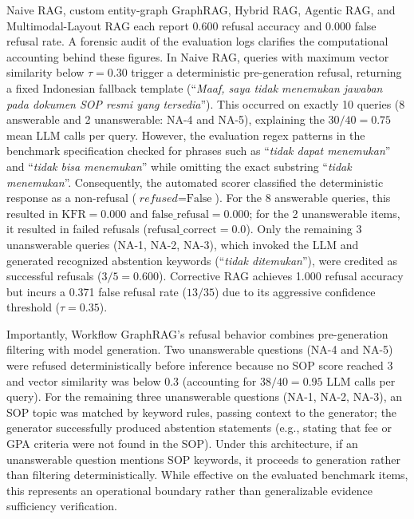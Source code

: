 \documentclass[preprint,10pt]{elsarticle}
\begin{document}
Naive RAG, custom entity-graph GraphRAG, Hybrid RAG, Agentic RAG, and Multimodal-Layout RAG each report 0.600 refusal accuracy and 0.000 false refusal rate. A forensic audit of the evaluation logs clarifies the computational accounting behind these figures. In Naive RAG, queries with maximum vector similarity below $\tau=0.30$ trigger a deterministic pre-generation refusal, returning a fixed Indonesian fallback template (``\textit{Maaf, saya tidak menemukan jawaban pada dokumen SOP resmi yang tersedia}''). This occurred on exactly 10 queries (8 answerable and 2 unanswerable: NA-4 and NA-5), explaining the $30/40 = 0.75$ mean LLM calls per query. However, the evaluation regex patterns in the benchmark specification checked for phrases such as ``\textit{tidak dapat menemukan}'' and ``\textit{tidak bisa menemukan}'' while omitting the exact substring ``\textit{tidak menemukan}''. Consequently, the automated scorer classified the deterministic response as a non-refusal ($\textit{refused} = \text{False}$). For the 8 answerable queries, this resulted in $\text{KFR} = 0.000$ and $\text{false\_refusal} = 0.000$; for the 2 unanswerable items, it resulted in failed refusals ($\text{refusal\_correct} = 0.0$). Only the remaining 3 unanswerable queries (NA-1, NA-2, NA-3), which invoked the LLM and generated recognized abstention keywords (``\textit{tidak ditemukan}''), were credited as successful refusals ($3/5 = 0.600$). Corrective RAG achieves 1.000 refusal accuracy but incurs a 0.371 false refusal rate ($13/35$) due to its aggressive confidence threshold ($\tau=0.35$).

Importantly, Workflow GraphRAG's refusal behavior combines pre-generation filtering with model generation. Two unanswerable questions (NA-4 and NA-5) were refused deterministically before inference because no SOP score reached 3 and vector similarity was below 0.3 (accounting for $38/40 = 0.95$ LLM calls per query). For the remaining three unanswerable questions (NA-1, NA-2, NA-3), an SOP topic was matched by keyword rules, passing context to the generator; the generator successfully produced abstention statements (e.g., stating that fee or GPA criteria were not found in the SOP). Under this architecture, if an unanswerable question mentions SOP keywords, it proceeds to generation rather than filtering deterministically. While effective on the evaluated benchmark items, this represents an operational boundary rather than generalizable evidence sufficiency verification.
\end{document}
